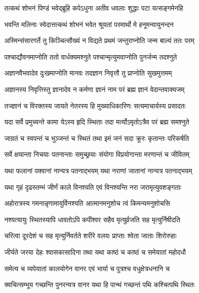 \twolineshloka
{तत्कथं शोभनं पिण्डं भवेद्ब्रूहि कपेऽधुना}
{अतीव धवलाः शुद्धाः पटा यत्सङ्गमेनहि}%

\twolineshloka
{भवन्ति मलिनाः स्वेदात्तत्कथं शोभनं भवेत}
{श्रूयतां परमार्थो मे हनूमन्वायुनन्दन}%

\twolineshloka
{अस्मिन्संसारगर्ते तु किञ्चित्सौख्यं न विद्यते}
{प्रथमं जन्तुराप्नोति जन्म बाल्यं ततः परम्}%

\twolineshloka
{पश्चाद्यौवनमाप्नोति ततो वार्धक्यमश्नुते}
{पश्चान्मृत्युमवाप्नोति पुनर्जन्म तदश्नुते}%

\twolineshloka
{अज्ञानवैभवादेव दुःखमाप्नोति मानवः}
{तदज्ञान निवृत्तौ तु प्राप्नोति सुखमुत्तमम्}%

\twolineshloka
{अज्ञानस्य निवृत्तिस्तु ज्ञानादेव न कर्मणा}
{ज्ञानं नाम परं ब्रह्म ज्ञानं वेदान्तवाक्यजम्}%

\twolineshloka
{तज्ज्ञानं च विरक्तस्य जायते नेतरस्य हि}
{मुख्याधिकारिणः सत्यमाचार्यस्य प्रसादतः}%

\twolineshloka
{यदा सर्वे प्रमुच्यन्ते कामा येऽस्य हृदि स्थिताः}
{तदा मर्त्योऽमृतोऽत्रैव परं ब्रह्म समश्नुते}%

\twolineshloka
{जाग्रतं च स्वपन्तं च भुञ्जन्तं च स्थितं तथा}
{इमं जनं सदा क्रूरः कृतान्तः परिकर्षति}%

\twolineshloka
{सर्वे क्षयान्ता निचयाः पतनान्ताः समुच्छ्रयाः}
{संयोगा विप्रयोगान्ता मरणान्तं च जीवितम्}%

\twolineshloka
{यथा फलानां पक्वानां नान्यत्र पतनाद्भयम्}
{यथा नराणां जातानां नान्यत्र पतनाद्भयम्}%

\twolineshloka
{यथा गृहं दृढस्तम्भं जीर्णं काले विनश्यति}
{एवं विनश्यन्ति नरा जरामृत्युवशङ्गताः}%

\twolineshloka
{अहोरात्रस्य गमनान्नृणामायुर्विनश्यति}
{आत्मानमनुशोच त्वं किमन्यमनुशोचसि}%

\twolineshloka
{नश्यत्यायुः स्थितस्यापि धावतोऽपि कपीश्वर}
{सहैव मृत्युर्व्रजति सह मृत्युर्निषीदति}%

\twolineshloka
{चरित्वा दूरदेशं च सह मृत्युर्निवर्तते}
{शरीरे वलयः प्राप्ताः श्वेता जाताः शिरोरुहाः}%

\twolineshloka
{जीर्यते जरया देहः श्वासकासादिना तथा}
{यथा काष्ठं च काष्ठं च समेयातां महोदधौ}%

\twolineshloka
{समेत्य च व्यपेयातां कालयोगेन वानर}
{एवं भार्या च पुत्रश्च वधुक्षेत्रधनानि च}%

\twolineshloka
{क्वचित्सम्भूय गच्छन्ति पुनरन्यत्र वानर}
{यथा हि पान्थं गच्छन्तं पथि कश्चित्पथि स्थितः}%

